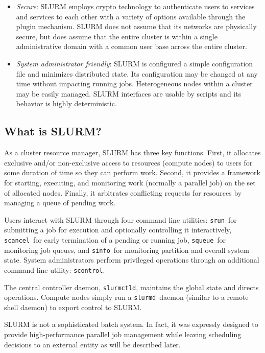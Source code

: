 \documentclass{article}
\newcommand{\srun}{{\tt srun}}
\newcommand{\scancel}{{\tt scancel}}
\newcommand{\squeue}{{\tt squeue}}
\newcommand{\sinfo}{{\tt sinfo}}
\newcommand{\slurmd}{{\tt slurmd}}
\begin{document}
\begin{itemize}
\item {\em Secure}: SLURM employs crypto technology to authenticate 
users to services and services to each other with a variety of options 
available through the plugin mechanism.  
SLURM does not assume that its networks are physically secure, 
but does assume that the entire cluster is within a single 
administrative domain with a common user base across the 
entire cluster.

\item {\em System administrator friendly}: SLURM is configured a 
simple configuration file and minimizes distributed state.  
Its configuration may be changed at any time without impacting running jobs. 
Heterogeneous nodes within a cluster may be easily managed.
SLURM interfaces are usable by scripts and its behavior is highly 
deterministic.

\end{itemize}

\subsection{What is SLURM?}

As a cluster resource manager, SLURM has three key functions.  First,
it allocates exclusive and/or non-exclusive access to resources 
(compute nodes) to users for 
some duration of time so they can perform work.  Second, it provides 
a framework for starting, executing, and monitoring work (normally a 
parallel job) on the set of allocated nodes.  Finally, it arbitrates 
conflicting requests for resources by managing a queue of pending work.

Users interact with SLURM through four command line utilities: 
\srun\ for submitting a job for execution and optionally controlling it
interactively, 
\scancel\ for early termination of a pending or running job, 
\squeue\ for monitoring job queues, and 
\sinfo\ for monitoring partition and overall system state.
System administrators perform privileged operations through an additional
command line utility: {\tt scontrol}.

The central controller daemon, {\tt slurmctld}, maintains the global state 
and directs operations.
Compute nodes simply run a \slurmd\ daemon (similar to a remote shell 
daemon) to export control to SLURM.  

SLURM is not a sophisticated batch system.  
In fact, it was expressly designed to provide high-performance 
parallel job management while leaving scheduling decisions to an 
external entity as will be described later. 
\end{document}
